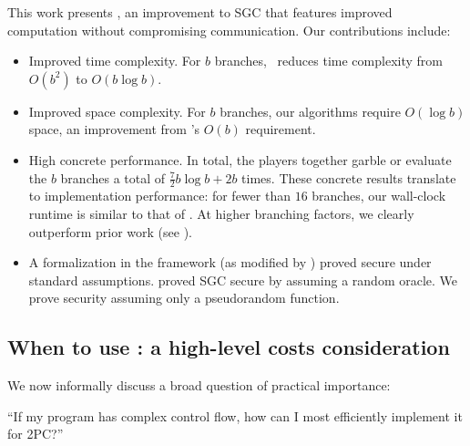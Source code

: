 \medskip
This work presents \ourschemelong, an improvement to SGC that features
improved computation without compromising communication.
Our contributions include:
\begin{itemize}
  \item Improved time complexity.
    For $b$ branches, \ourschemelong\ reduces time complexity from $O(b^2)$ to
    $O(b \log b)$.
  \item Improved space complexity.
    For $b$ branches, our algorithms require $O(\log b)$ space, an
    improvement from \HK's $O(b)$ requirement.
  \item High concrete performance.
    In total, the players together garble or evaluate the $b$ branches
    a total of $\frac{7}{2} b\log b + 2b$ times.
    These concrete results translate to implementation performance: for fewer
    than $16$ branches, our wall-clock runtime is similar to that
    of \HK. At higher branching factors, we clearly outperform prior
    work (see ).
  \item
    A formalization in the \cite{CCS:BelHoaRog12} framework (as
    modified by \HK) proved
    secure under standard assumptions.
    \HK proved SGC secure by assuming a random oracle.
    We prove security assuming only a pseudorandom function.
\end{itemize}



\subsection{When to use \ourschemelong: a high-level costs consideration}
\label{sec:whentouse}

We now informally discuss a broad question of
practical importance:

\begin{displayquote}
  ``If my program has complex control flow, how can I most efficiently implement it for 2PC?''
\end{displayquote}

